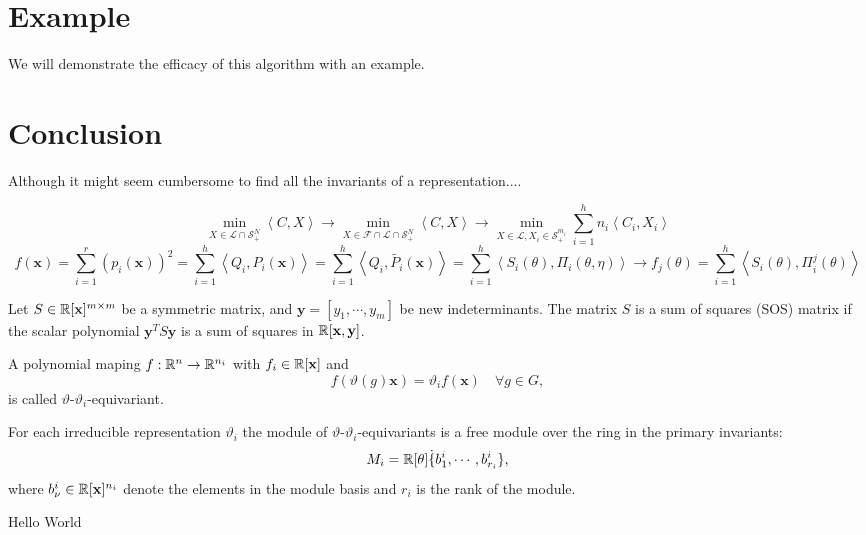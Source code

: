 \documentclass[]{article}
\begin{document}
\section{Example}
We will demonstrate the efficacy of this algorithm with an example.
\section{Conclusion}
Although it might seem cumbersome to find all the invariants of a representation.... 



\[ \min_{X\in\mathcal{L}\cap \mathcal{S}_+^N } \left<C,X\right> \rightarrow 
\min_{X\in\mathcal{F}\cap\mathcal{L}\cap \mathcal{S}_+^N } \left<C,X\right> \rightarrow
\min_{X\in\mathcal{L}, X_i \in \mathcal{S}_+^{m_i} }\sum_{i=1}^{h} n_i\left<C_i,X_i\right>\]
\[f(\mathbf{x}) = \sum_{i= 1}^{r} (p_i(\mathbf{x}))^2 
                = \sum_{i=1}^{h}\left<Q_i,P_i(\mathbf{x})\right> 
                = \sum_{i=1}^{h}\left<Q_i,\tilde{P_i}(\mathbf{x})\right>
                = \sum_{i=1}^{h}\left<S_i(\theta),\Pi_i(\theta,\eta)\right> 
                \rightarrow f_j(\theta) = \sum_{i=1}^{h}\left<S_i(\theta),\Pi_i^j(\theta)\right>  \]

\begin{definition}
    Let $S\in \mathbb R[\textbf{x}]^{m\times m}$ be a symmetric matrix, and $\textbf{y} = [y_1,\cdots,y_m]$ be new indeterminants. The matrix $S$ is a sum of squares (SOS) matrix if the scalar polynomial $\textbf{y}^TS\textbf{y}$ 
    is a sum of squares in $\mathbb R[\textbf{x},\textbf{y}]$.   
\end{definition}

\begin{definition}
    A polynomial maping $f:\mathbb R^n\rightarrow \mathbb R^{n_i}$ with $f_i\in\mathbb R[\mathbf{x}]$ and 
    \[ f(\vartheta(g)\mathbf{x}) =\vartheta_i f(\mathbf{x})\quad \forall g\in G, \]
is called $\vartheta$-$\vartheta_i$-equivariant.
\end{definition}


\begin{theorem}
    For each irreducible representation $\vartheta_i$ the module of $\vartheta$-$\vartheta_i$-equivariants is a
    free module over the ring in the primary invariants:
    \[M_i = \mathbb R[\theta]\dot\{b_1^i,\cdots,b_{r_i}^i\},\]
    where $b_{\nu}^i\in \mathbb R[\mathbf{x}]^{n_i}$ denote the elements in the module basis and $r_i$ is the rank of the module.
\end{theorem}


\cite{Gatermann_2004}



Hello World
\end{document}
